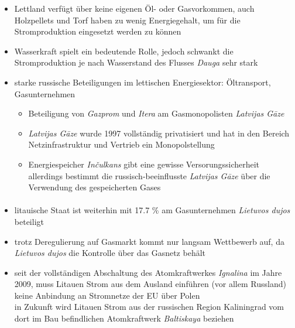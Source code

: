 \documentclass[11pt,a4paper]{article}
\begin{document}
\begin{itemize}

\item Lettland verfügt über keine eigenen Öl- oder Gasvorkommen, auch Holzpellets und Torf haben zu wenig Energiegehalt, um für die Stromproduktion eingesetzt werden zu können

\item Wasserkraft spielt ein bedeutende Rolle, jedoch schwankt die Stromproduktion je nach Wasserstand des Flusses \textsl{Dauga} sehr stark

\item starke russische Beteiligungen im lettischen Energiesektor: Öltransport, Gasunternehmen


	\begin{itemize}
	
	\item Beteiligung von \emph{Gazprom} und \emph{Itera} am Gasmonopolisten \emph{Latvijas G\={a}ze}
	
	\item \emph{Latvijas G\={a}ze} wurde 1997 vollständig privatisiert und hat in den Bereich Netzinfrastruktur und Vertrieb ein Monopolstellung
	
	\item Energiespeicher \textsl{In\v{c}ulkans} gibt eine gewisse Versorungssicherheit\\
	 allerdings bestimmt die russisch-beeinflusste \emph{Latvijas G\={a}ze} über die Verwendung des gespeicherten Gases
	
	\end{itemize}

\end{itemize}


\paragraph{\color{Orange}{Energiemarkt Litauen}}

\begin{itemize}

\item litauische Staat ist weiterhin mit 17.7 \% am Gasunternehmen \emph{Lietuvos dujos} beteiligt

\item trotz Deregulierung auf Gasmarkt kommt nur langsam Wettbewerb auf, da \emph{Lietuvos dujos} die Kontrolle über das Gasnetz behält

\item seit der vollständigen Abschaltung des Atomkraftwerkes \textsl{Ignalina} im Jahre 2009, muss Litauen Strom aus dem Ausland einführen (vor allem Russland)\\
 keine Anbindung an Stromnetze der EU über Polen\\
 in Zukunft wird Litauen Strom aus der russischen Region Kaliningrad vom dort im Bau befindlichen Atomkraftwerk \textsl{Baltiskaya} beziehen

\end{itemize}
\end{document}
